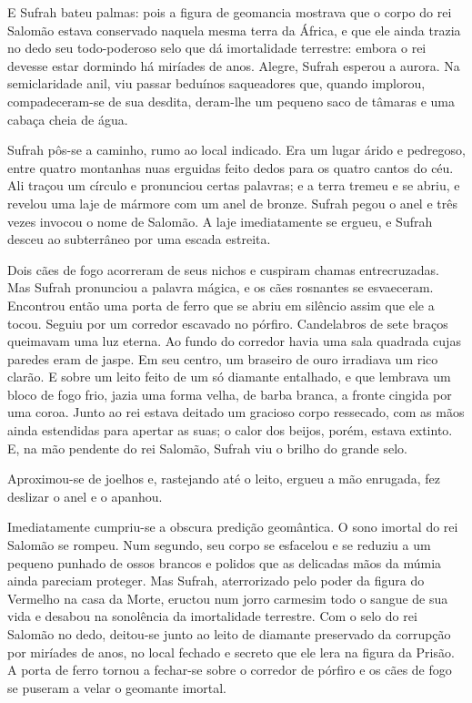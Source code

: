 E Sufrah bateu palmas: pois a figura de geomancia mostrava que o corpo do
rei Salomão estava conservado naquela mesma terra da África, e que ele
ainda trazia no dedo seu todo-poderoso selo que dá imortalidade terrestre:
embora o rei devesse estar dormindo há miríades de anos. Alegre, Sufrah
esperou a aurora. Na semiclaridade anil, viu passar beduínos saqueadores
que, quando implorou, compadeceram-se de sua desdita, deram-lhe um pequeno
saco de tâmaras e uma cabaça cheia de água.

Sufrah pôs-se a caminho, rumo ao local indicado. Era um lugar árido e
pedregoso, entre quatro montanhas nuas erguidas feito dedos para os quatro
cantos do céu. Ali traçou um círculo e pronunciou certas palavras; e a
terra tremeu e se abriu, e revelou uma laje de mármore com um anel de
bronze. Sufrah pegou o anel e três vezes invocou o nome de Salomão. A laje
imediatamente se ergueu, e Sufrah desceu ao subterrâneo por uma escada
estreita.

Dois cães de fogo acorreram de seus nichos e cuspiram chamas entrecruzadas.
Mas Sufrah pronunciou a palavra mágica, e os cães rosnantes se esvaeceram.
Encontrou então uma porta de ferro que se abriu em silêncio assim que ele
a tocou. Seguiu por um corredor escavado no pórfiro. Candelabros de sete
braços queimavam uma luz eterna. Ao fundo do corredor havia uma sala
quadrada cujas paredes eram de jaspe. Em seu centro, um braseiro de ouro
irradiava um rico clarão. E sobre um leito feito de um só diamante
entalhado, e que lembrava um bloco de fogo frio, jazia uma forma velha, de
barba branca, a fronte cingida por uma coroa. Junto ao rei estava deitado
um gracioso corpo ressecado, com as mãos ainda estendidas para apertar as
suas; o calor dos beijos, porém, estava extinto. E, na mão pendente do rei
Salomão, Sufrah viu o brilho do grande selo.

Aproximou-se de joelhos e, rastejando até o leito, ergueu a mão enrugada,
fez deslizar o anel e o apanhou. 

Imediatamente cumpriu-se a obscura predição geomântica. O sono imortal do
rei Salomão se rompeu. Num segundo, seu corpo se esfacelou e se reduziu a
um pequeno punhado de ossos brancos e polidos que as delicadas mãos da
múmia ainda pareciam proteger. Mas Sufrah, aterrorizado pelo poder da
figura do Vermelho na casa da Morte, eructou num jorro carmesim todo o
sangue de sua vida e desabou na sonolência da imortalidade terrestre. Com
o selo do rei Salomão no dedo, deitou-se junto ao leito de diamante
preservado da corrupção por miríades de anos, no local fechado e secreto
que ele lera na figura da Prisão. A porta de ferro tornou a fechar-se
sobre o corredor de pórfiro e os cães de fogo se puseram a velar o
geomante imortal.

